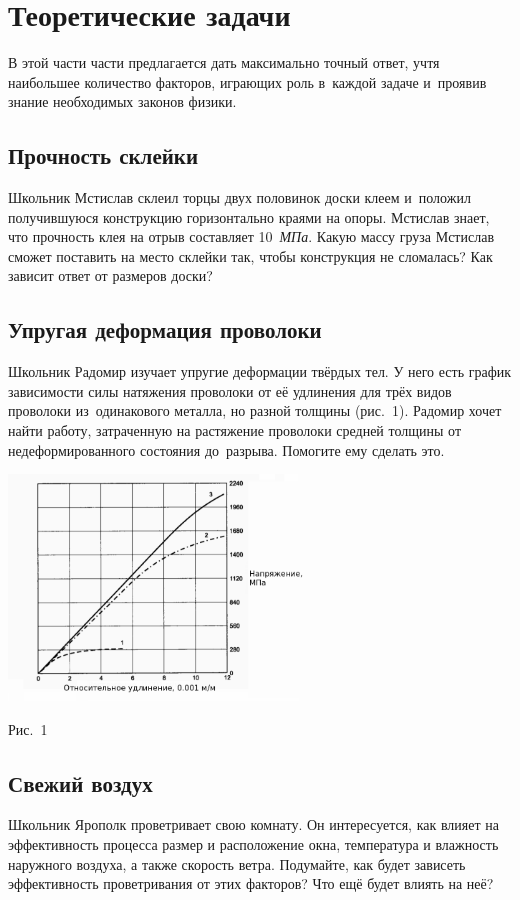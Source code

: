 \documentclass[a4paper,12pt]{article}
\begin{document}
\section{Теоретические задачи}

В этой части части предлагается
дать максимально точный ответ, учтя наибольшее количество факторов, играющих роль в~каждой
задаче и~проявив знание необходимых законов физики.

\subsection{Прочность склейки}
Школьник Мстислав склеил торцы двух половинок доски клеем и~положил получившуюся конструкцию
горизонтально краями на опоры. Мстислав знает, что прочность клея на отрыв составляет 10~\emph{МПа}.
Какую массу груза Мстислав сможет поставить на место склейки так, чтобы конструкция не сломалась?
Как зависит ответ от размеров доски?

\subsection{Упругая деформация проволоки}
Школьник Радомир изучает упругие деформации твёрдых тел. У него есть график зависимости силы
натяжения проволоки от её удлинения для трёх видов проволоки из~одинакового металла, но
разной толщины (рис.~1). Радомир хочет найти работу, затраченную на растяжение проволоки
средней толщины от недеформированного состояния до~разрыва. Помогите ему сделать это.

\medskip
\centerline{\includegraphics[height=60mm]{tension.png}}
\medskip
\centerline{\small Рис.~1}

\subsection{Свежий воздух}
Школьник Ярополк проветривает свою комнату. Он интересуется, как влияет на эффективность процесса
размер и расположение окна, температура и влажность наружного воздуха, а также скорость ветра.
Подумайте, как будет зависеть эффективность проветривания от этих факторов?
Что ещё будет влиять на неё?
\end{document}
